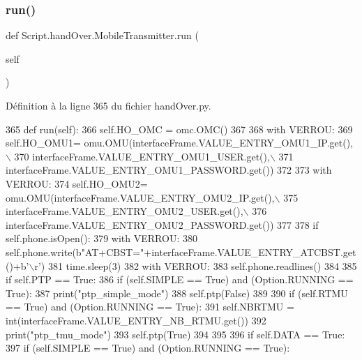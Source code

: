 \subsubsection{\texorpdfstring{run()}{run()}}
{\footnotesize\ttfamily def Script.\+hand\+Over.\+Mobile\+Transmitter.\+run (\begin{DoxyParamCaption}\item[{}]{self }\end{DoxyParamCaption})}



Définition à la ligne 365 du fichier hand\+Over.\+py.


\begin{DoxyCode}
365     \textcolor{keyword}{def }run(self):
366         self.HO\_OMC = omc.OMC()
367 
368         with VERROU:
369             self.HO\_OMU1= omu.OMU(interfaceFrame.VALUE\_ENTRY\_OMU1\_IP.get(),\(\backslash\)
370                 interfaceFrame.VALUE\_ENTRY\_OMU1\_USER.get(),\(\backslash\)
371                 interfaceFrame.VALUE\_ENTRY\_OMU1\_PASSWORD.get())
372 
373         with VERROU:
374             self.HO\_OMU2= omu.OMU(interfaceFrame.VALUE\_ENTRY\_OMU2\_IP.get(),\(\backslash\)
375              interfaceFrame.VALUE\_ENTRY\_OMU2\_USER.get(),\(\backslash\)
376              interfaceFrame.VALUE\_ENTRY\_OMU2\_PASSWORD.get())
377 
378         \textcolor{keywordflow}{if} self.phone.isOpen():
379             with VERROU:
380                 self.phone.write(b\textcolor{stringliteral}{"AT+CBST="}+interfaceFrame.VALUE\_ENTRY\_ATCBST.get()+b\textcolor{stringliteral}{'\(\backslash\)r'})
381             time.sleep(3)
382             with VERROU:
383                 self.phone.readlines()
384 
385         \textcolor{keywordflow}{if} self.PTP == \textcolor{keyword}{True}:
386             \textcolor{keywordflow}{if} (self.SIMPLE == \textcolor{keyword}{True}) \textcolor{keywordflow}{and} (Option.RUNNING == \textcolor{keyword}{True}):
387                 print(\textcolor{stringliteral}{"ptp\_simple\_mode"})
388                 self.ptp(\textcolor{keyword}{False})
389 
390             \textcolor{keywordflow}{if} (self.RTMU == \textcolor{keyword}{True}) \textcolor{keywordflow}{and} (Option.RUNNING == \textcolor{keyword}{True}):
391                 self.NBRTMU = int(interfaceFrame.VALUE\_ENTRY\_NB\_RTMU.get())
392                 print(\textcolor{stringliteral}{"ptp\_tmu\_mode"})
393                 self.ptp(\textcolor{keyword}{True})
394 
395 
396         \textcolor{keywordflow}{if} self.DATA == \textcolor{keyword}{True}:
397             \textcolor{keywordflow}{if} (self.SIMPLE == \textcolor{keyword}{True}) \textcolor{keywordflow}{and} (Option.RUNNING == \textcolor{keyword}{True}):

\end{DoxyCode}

